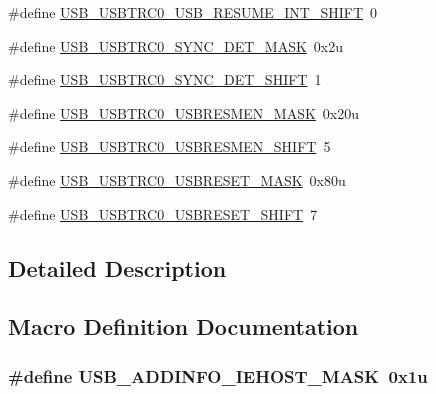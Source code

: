\begin{DoxyCompactItemize}
\item 
\#define \hyperlink{group___u_s_b___register___masks_ga48af1176ed5d811c299eb123f934425d}{U\+S\+B\+\_\+\+U\+S\+B\+T\+R\+C0\+\_\+\+U\+S\+B\+\_\+\+R\+E\+S\+U\+M\+E\+\_\+\+I\+N\+T\+\_\+\+S\+H\+I\+FT}~0
\item 
\#define \hyperlink{group___u_s_b___register___masks_ga2e2f3b4bb79885ed92d75c9f86d42e23}{U\+S\+B\+\_\+\+U\+S\+B\+T\+R\+C0\+\_\+\+S\+Y\+N\+C\+\_\+\+D\+E\+T\+\_\+\+M\+A\+SK}~0x2u
\item 
\#define \hyperlink{group___u_s_b___register___masks_ga986ea3386acad15ab845a8c5d9644c9e}{U\+S\+B\+\_\+\+U\+S\+B\+T\+R\+C0\+\_\+\+S\+Y\+N\+C\+\_\+\+D\+E\+T\+\_\+\+S\+H\+I\+FT}~1
\item 
\#define \hyperlink{group___u_s_b___register___masks_gaf236b1fdfa7f7dab54961c74538dfb75}{U\+S\+B\+\_\+\+U\+S\+B\+T\+R\+C0\+\_\+\+U\+S\+B\+R\+E\+S\+M\+E\+N\+\_\+\+M\+A\+SK}~0x20u
\item 
\#define \hyperlink{group___u_s_b___register___masks_ga4b62f293769f60cae99319d6bb1299e8}{U\+S\+B\+\_\+\+U\+S\+B\+T\+R\+C0\+\_\+\+U\+S\+B\+R\+E\+S\+M\+E\+N\+\_\+\+S\+H\+I\+FT}~5
\item 
\#define \hyperlink{group___u_s_b___register___masks_ga3b307f8358be6942775121b6a92243ab}{U\+S\+B\+\_\+\+U\+S\+B\+T\+R\+C0\+\_\+\+U\+S\+B\+R\+E\+S\+E\+T\+\_\+\+M\+A\+SK}~0x80u
\item 
\#define \hyperlink{group___u_s_b___register___masks_gab20fcb9276a34cbbd33ac0364c419f13}{U\+S\+B\+\_\+\+U\+S\+B\+T\+R\+C0\+\_\+\+U\+S\+B\+R\+E\+S\+E\+T\+\_\+\+S\+H\+I\+FT}~7
\end{DoxyCompactItemize}


\subsection{Detailed Description}


\subsection{Macro Definition Documentation}
\subsubsection[{\texorpdfstring{U\+S\+B\+\_\+\+A\+D\+D\+I\+N\+F\+O\+\_\+\+I\+E\+H\+O\+S\+T\+\_\+\+M\+A\+SK}{USB_ADDINFO_IEHOST_MASK}}]{\setlength{\rightskip}{0pt plus 5cm}\#define U\+S\+B\+\_\+\+A\+D\+D\+I\+N\+F\+O\+\_\+\+I\+E\+H\+O\+S\+T\+\_\+\+M\+A\+SK~0x1u}\hypertarget{group___u_s_b___register___masks_gacb7c792034c73c4861bc8fba6ff4314f}{}\label{group___u_s_b___register___masks_gacb7c792034c73c4861bc8fba6ff4314f}


